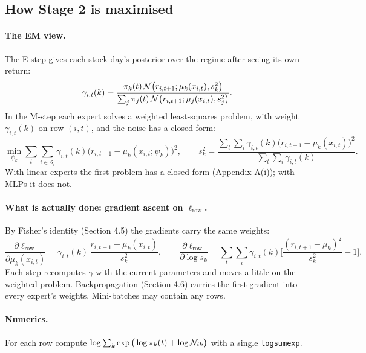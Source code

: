 \subsection{How Stage 2 is maximised}

\paragraph{The EM view.} The E-step gives each stock-day's posterior over the regime after seeing its own return:
\begin{equation}
\gamma_{i,t}(k)=\frac{\pi_k(t)\,\mathcal{N}\big(r_{i,t+1};\mu_k(x_{i,t}),s_k^2\big)}{\sum_j\pi_j(t)\,\mathcal{N}\big(r_{i,t+1};\mu_j(x_{i,t}),s_j^2\big)}.
\end{equation}
In the M-step each expert solves a weighted least-squares problem, with weight $\gamma_{i,t}(k)$ on row $(i,t)$, and the noise has a closed form:
\begin{equation}
\min_{\psi_k}\sum_t\sum_{i\in\mathcal S_t}\gamma_{i,t}(k)\big(r_{i,t+1}-\mu_k(x_{i,t};\psi_k)\big)^2,\qquad s_k^2=\frac{\sum_t\sum_i\gamma_{i,t}(k)\big(r_{i,t+1}-\mu_k(x_{i,t})\big)^2}{\sum_t\sum_i\gamma_{i,t}(k)}.
\end{equation}
With linear experts the first problem has a closed form (Appendix A(i)); with MLPs it does not.

\paragraph{What is actually done: gradient ascent on $\ell_{\text{row}}$.} By Fisher's identity (Section 4.5) the gradients carry the same weights:
\begin{equation}
\frac{\partial\ell_{\text{row}}}{\partial\mu_k(x_{i,t})}=\gamma_{i,t}(k)\,\frac{r_{i,t+1}-\mu_k(x_{i,t})}{s_k^2},\qquad\frac{\partial\ell_{\text{row}}}{\partial\log s_k}=\sum_t\sum_i\gamma_{i,t}(k)\Big[\frac{(r_{i,t+1}-\mu_k)^2}{s_k^2}-1\Big].
\end{equation}
Each step recomputes $\gamma$ with the current parameters and moves a little on the weighted problem. Backpropagation (Section 4.6) carries the first gradient into every expert's weights. Mini-batches may contain any rows.

\paragraph{Numerics.} For each row compute $\log\sum_k\exp\big(\log\pi_k(t)+\log\mathcal{N}_{ik}\big)$ with a single \texttt{logsumexp}.

